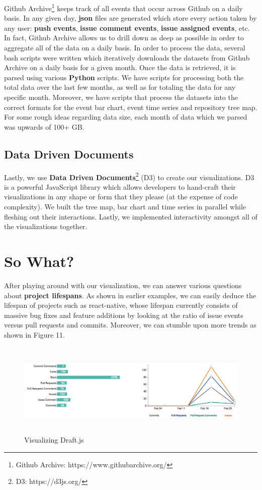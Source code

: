 \documentclass{article}
\begin{document}
Github Archive\footnote{Github Archive: https://www.githubarchive.org/} keeps track of all events that occur across Github on a daily basis. In any given day, \textbf{json} files are generated which store every action taken by any user: \textbf{push events}, \textbf{issue comment events}, \textbf{issue assigned events}, etc. In fact, Github Archive allows us to drill down as deep as possible in order to aggregate all of the data on a daily basis. In order to process the data, several bash scripts were written which iteratively downloads the datasets from Github Archive on a daily basis for a given month. Once the data is retrieved, it is parsed using various \textbf{Python} scripts. We have scripts for processing both the total data over the last few months, as well as for totaling the data for any specific month. Moreover, we have scripts that process the datasets into the correct formats for the event bar chart, event time series and repository tree map. For some rough ideas regarding data size, each month of data which we parsed was upwards of 100+ GB.

\subsection {Data Driven Documents}

Lastly, we use \textbf{Data Driven Documents}\footnote{D3: https://d3js.org/} (D3) to create our visualizations. D3 is a powerful JavaScript library which allows developers to hand-craft their visualizations in any shape or form that they please (at the expense of code complexity). We built the tree map, bar chart and time series in parallel while fleshing out their interactions. Lastly, we implemented interactivity amongst all of the visualizations together.

\section {So What?}

After playing around with our visualization, we can answer various questions about \textbf{project lifespans}. As shown in earlier examples, we can easily deduce the lifespan of projects such as react-native, whose lifespan currently consists of massive bug fixes and feature additions by looking at the ratio of issue events versus pull requests and commits. Moreover, we can stumble upon more trends as shown in Figure 11.

\newpage

\begin{figure}[h!]
\centering
\includegraphics[height=4.5cm, width=17cm]{draft}
\caption{Visualizing Draft.js}
\end{figure}
\end{document}
